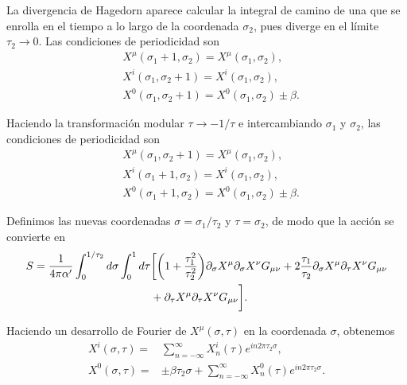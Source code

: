 La divergencia de Hagedorn aparece calcular la integral de camino de una que se enrolla en el tiempo 
a lo largo de la coordenada  $\sigma_2$, pues diverge en el límite $\tau_2\to0$.
Las condiciones de periodicidad son
\begin{equation}
  \begin{aligned}
    &X^\mu(\sigma_1+1,\sigma_2)=X^\mu(\sigma_1,\sigma_2),\\
    &X^i(\sigma_1,\sigma_2+1)=X^i(\sigma_1,\sigma_2),\\
    &X^0(\sigma_1,\sigma_2+1) = X^0(\sigma_1,\sigma_2)\pm \beta.
  \end{aligned}
\end{equation}

Haciendo la transformación modular $\tau\to-1/\tau$ e intercambiando $\sigma_1$ y $\sigma_2$, las
condiciones de periodicidad son
\begin{equation}
  \begin{aligned}
    &X^\mu(\sigma_1,\sigma_2+1)=X^\mu(\sigma_1,\sigma_2),\\
    &X^i(\sigma_1+1,\sigma_2)=X^i(\sigma_1,\sigma_2),\\
    &X^0(\sigma_1+1,\sigma_2) = X^0(\sigma_1,\sigma_2)\pm \beta.
  \end{aligned}
\end{equation}

Definimos las nuevas coordenadas $\sigma=\sigma_1/\tau_2$ y $\tau=\sigma_2$, de modo 
que la acción se convierte en 
\begin{equation}
  \begin{aligned}
    S= \frac{1}{4\pi \alpha'}\int_0^{1/\tau_2} d\sigma  \int_0^1 d\tau 
    &\biggl[
      \qty(1+\frac{\tau_1^2}{\tau^2_2})\partial_\sigma X^\mu \partial_\sigma X^\nu G_{\mu\nu} +
      2\frac{\tau_1}{\tau_2}\partial_\sigma X^\mu \partial_\tau X^\nu G_{\mu\nu}  \\
      &+ \partial_\tau X^\mu \partial_\tau X^\nu G_{\mu\nu}\biggl].
  \end{aligned}
\end{equation}


Haciendo un desarrollo de Fourier de $X^\mu(\sigma,\tau)$ en la coordenada $\sigma$, obtenemos
\begin{equation}
  \begin{aligned}
    X^i(\sigma,\tau) =& \sum_{n=-\infty}^\infty X_n^i(\tau) e^{in2\pi \tau_2 \sigma}, \\
    X^0(\sigma,\tau) =& \pm \beta \tau_2 \sigma +  \sum_{n=-\infty}^\infty X_n^0(\tau) e^{in2\pi \tau_2 \sigma}.
  \end{aligned}
\end{equation}

